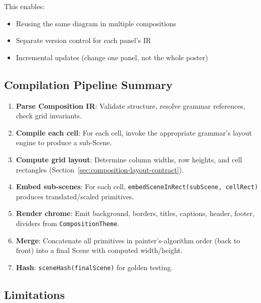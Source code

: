 This enables:
\begin{itemize}
  \item Reusing the same diagram in multiple compositions
  \item Separate version control for each panel's IR
  \item Incremental updates (change one panel, not the whole poster)
\end{itemize}

\subsection{Compilation Pipeline Summary}
\label{sec:composition-pipeline}

\begin{enumerate}
  \item \textbf{Parse Composition IR}: Validate structure, resolve grammar references, check grid invariants.
  
  \item \textbf{Compile each cell}: For each cell, invoke the appropriate grammar's layout engine to produce a sub-Scene.
  
  \item \textbf{Compute grid layout}: Determine column widths, row heights, and cell rectangles (Section~\ref{sec:composition-layout-contract}).
  
  \item \textbf{Embed sub-scenes}: For each cell, \texttt{embedSceneInRect(subScene, cellRect)} produces translated/scaled primitives.
  
  \item \textbf{Render chrome}: Emit background, borders, titles, captions, header, footer, dividers from \texttt{CompositionTheme}.
  
  \item \textbf{Merge}: Concatenate all primitives in painter's-algorithm order (back to front) into a final Scene with computed width/height.
  
  \item \textbf{Hash}: \texttt{sceneHash(finalScene)} for golden testing.
\end{enumerate}

\subsection{Limitations}
\label{sec:composition-limitations}

